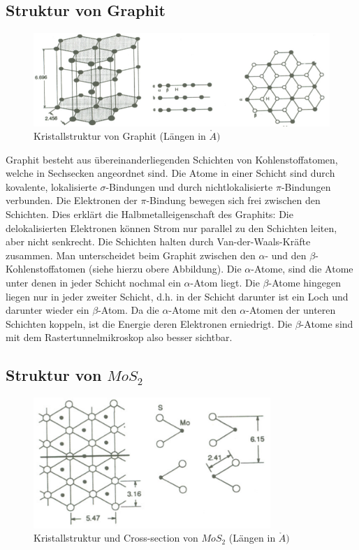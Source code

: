 \subsection{Struktur von Graphit}

\begin{figure}[H]
	\centering \includegraphics[width=\textwidth]{Bilder/Graphit.png}
	\caption{Kristallstruktur von Graphit (Längen in $\mathring{A})$}
\end{figure}

Graphit besteht aus übereinanderliegenden Schichten von Kohlenstoffatomen, welche in Sechsecken angeordnet sind. Die Atome in einer Schicht sind durch kovalente, lokalisierte $\sigma$-Bindungen und durch nichtlokalisierte $\pi$-Bindungen verbunden. Die Elektronen der $\pi$-Bindung bewegen sich frei zwischen den Schichten. Dies erklärt die Halbmetalleigenschaft des Graphits: Die delokalisierten Elektronen können Strom nur parallel zu den Schichten leiten, aber nicht senkrecht. Die Schichten halten durch Van-der-Waals-Kräfte zusammen. Man unterscheidet beim Graphit zwischen den $\alpha$- und den $\beta$-Kohlenstoffatomen (siehe hierzu obere Abbildung). Die $\alpha$-Atome, sind die Atome unter denen in jeder Schicht nochmal ein $\alpha$-Atom liegt. Die $\beta$-Atome hingegen liegen nur in jeder zweiter Schicht, d.h. in der Schicht darunter ist ein Loch und darunter wieder ein $\beta$-Atom. Da die $\alpha$-Atome mit den $\alpha$-Atomen der unteren Schichten koppeln, ist die Energie deren Elektronen erniedrigt. Die $\beta$-Atome sind mit dem Rastertunnelmikroskop also besser sichtbar.

\subsection{Struktur von $MoS_2$}

\begin{figure}[H]
	\centering \includegraphics[width=0.8\textwidth]{Bilder/MoS2.png}
	\caption{Kristallstruktur und Cross-section von $MoS_2$ (Längen in $\mathring{A})$}
\end{figure}

